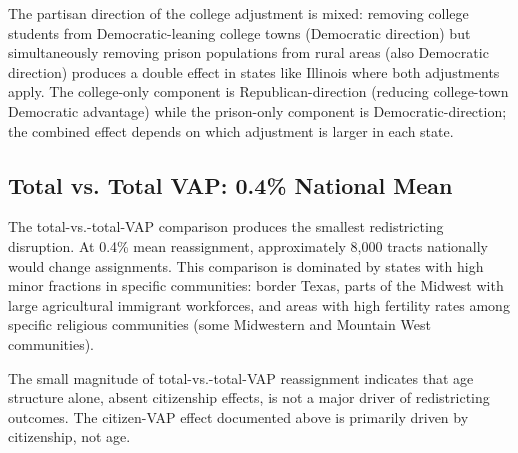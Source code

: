The partisan direction of the college adjustment is mixed: removing college students from Democratic-leaning college towns (Democratic direction) but simultaneously removing prison populations from rural areas (also Democratic direction) produces a double effect in states like Illinois where both adjustments apply. The college-only component is Republican-direction (reducing college-town Democratic advantage) while the prison-only component is Democratic-direction; the combined effect depends on which adjustment is larger in each state.

\subsection{Total vs. Total VAP: 0.4\% National Mean}

The total-vs.-total-VAP comparison produces the smallest redistricting disruption. At 0.4\% mean reassignment, approximately 8,000 tracts nationally would change assignments. This comparison is dominated by states with high minor fractions in specific communities: border Texas, parts of the Midwest with large agricultural immigrant workforces, and areas with high fertility rates among specific religious communities (some Midwestern and Mountain West communities).

The small magnitude of total-vs.-total-VAP reassignment indicates that age structure alone, absent citizenship effects, is not a major driver of redistricting outcomes. The citizen-VAP effect documented above is primarily driven by citizenship, not age.
